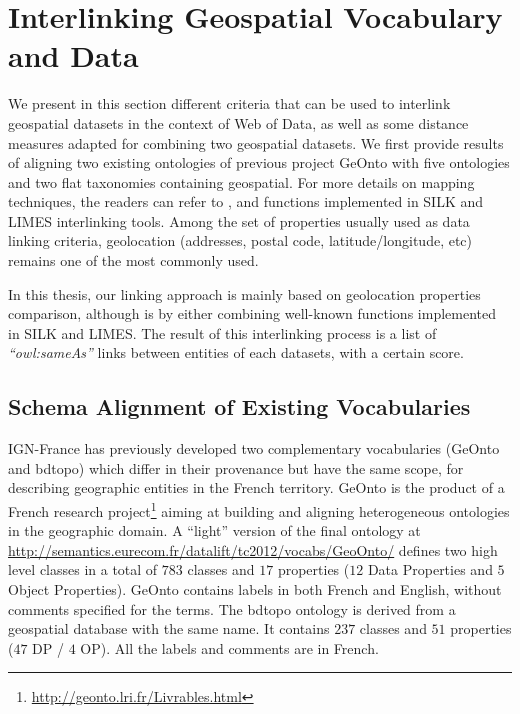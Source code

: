 \section{Interlinking Geospatial Vocabulary and Data}
\label{sec:interlinking}

We present in this section different criteria that can be used to interlink geospatial datasets in the context of Web of Data, as well as some distance measures adapted for combining two geospatial datasets. We first provide results of aligning two existing ontologies of previous project GeOnto with five ontologies and two flat taxonomies containing geospatial. For more details on mapping techniques, the readers can refer to \cite{euzenat2007}, and functions implemented in SILK \cite{jentzsch2010silk,isele2011} and LIMES \cite{ngau11} interlinking tools. Among the set of properties usually used as data linking criteria, geolocation (addresses, postal code, latitude/longitude, etc) remains one of the most commonly used.

In this thesis, our linking approach is mainly based on geolocation properties comparison, although is by either combining well-known functions implemented in SILK and LIMES. The result of this interlinking process is a list of \textit{``owl:sameAs''} links between entities of each datasets, with a certain score.

\subsection{Schema Alignment of Existing Vocabularies}                                         \label{sec:vocabalignment}
IGN-France has previously developed two complementary vocabularies (GeOnto and bdtopo) which differ in their provenance but have the same scope, for describing geographic entities in the French territory. GeOnto is the product of a French research project\footnote{\url{http://geonto.lri.fr/Livrables.html}} aiming at building and aligning heterogeneous ontologies in the geographic domain. A ``light'' version of the final ontology at \url{http://semantics.eurecom.fr/datalift/tc2012/vocabs/GeoOnto/} defines two high level classes in a total of $783$ classes and $17$ properties ($12$ Data Properties and $5$ Object Properties). GeOnto contains labels in both French and English, without comments specified for the terms. The bdtopo ontology is derived from a geospatial database with the same name. It contains $237$ classes and $51$ properties ($47$ DP / $4$ OP). All the labels and comments are in French.

